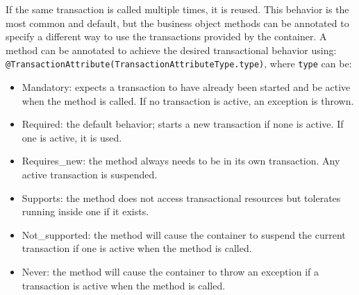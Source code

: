 If the same transaction is called multiple times, it is reused.
This behavior is the most common and default, but the business object methods can be annotated to specify a different way to use the transactions provided by the container. 
A method can be annotated to achieve the desired transactional behavior using: 
\texttt{@TransactionAttribute(TransactionAttributeType.type)}, where \texttt{type} can be: 
\begin{itemize}
    \item Mandatory: expects a transaction to have already been started and be active when the method is called. 
        If no transaction is active, an exception is thrown.
    \item Required: the default behavior; starts a new transaction if none is active. 
        If one is active, it is used.
    \item Requires\_new: the method always needs to be in its own transaction.
        Any active transaction is suspended.
    \item Supports: the method does not access transactional resources but tolerates running inside one if it exists.
    \item Not\_supported: the method will cause the container to suspend the current transaction if one is active when the method is called.
    \item Never: the method will cause the container to throw an exception if a transaction is active when the method is called.
\end{itemize}